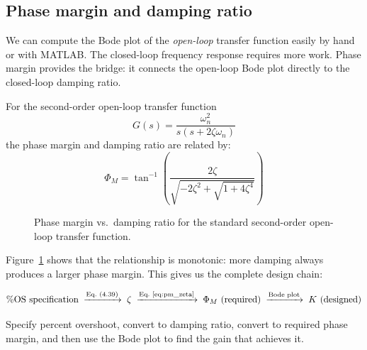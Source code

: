 \documentclass[12pt]{article}
\newcommand{\figplaceholder}[2][3in]{%
  \begin{center}
  \fbox{\parbox{#1}{\centering\vspace{0.5in}\textit{[Figure: #2]}\vspace{0.5in}}}
  \end{center}
}
\begin{document}
\subsection{Phase margin and damping ratio}
\label{sec:pm_zeta}

We can compute the Bode plot of the \emph{open-loop} transfer function easily
by hand or with MATLAB\@.  The closed-loop frequency response requires more work.
Phase margin provides the bridge: it connects the open-loop Bode plot directly
to the closed-loop damping ratio.

For the second-order open-loop transfer function
\begin{equation}
  G(s) = \frac{\omega_n^2}{s(s+2\zeta\omega_n)}
  \label{eq:second_order_ol}
\end{equation}
the phase margin and damping ratio are related by:
\begin{equation}
  \boxed{
    \Phi_M = \tan^{-1}\!\left(\frac{2\zeta}{\sqrt{-2\zeta^2+\sqrt{1+4\zeta^4}}}\right)
  }
  \label{eq:pm_zeta}
\end{equation}

\begin{figure}[htbp]
  \figplaceholder[3.5in]{Phase margin $\Phi_M$ (degrees) vs.\ damping ratio
    $\zeta$ from Eq.~\eqref{eq:pm_zeta}.  The curve is monotonically
    increasing from $0^\circ$ at $\zeta=0$ through $65.5^\circ$ at
    $\zeta=0.707$ and approaching $90^\circ$ for large $\zeta$.
    [Nise Fig.~10.48]}
  \caption{Phase margin vs.\ damping ratio for the standard second-order
    open-loop transfer function.}
  \label{fig:pm_zeta}
\end{figure}

Figure~\ref{fig:pm_zeta} shows that the relationship is monotonic: more damping
always produces a larger phase margin.  This gives us the complete design chain:

\begin{equation*}
  \text{\%OS specification}
  \;\xrightarrow{\text{Eq.~(4.39)}}\;
  \zeta
  \;\xrightarrow{\text{Eq.~\eqref{eq:pm_zeta}}}\;
  \Phi_M \text{ (required)}
  \;\xrightarrow{\text{Bode plot}}\;
  K \text{ (designed)}
\end{equation*}

Specify percent overshoot, convert to damping ratio, convert to required phase
margin, and then use the Bode plot to find the gain that achieves it.
\end{document}
